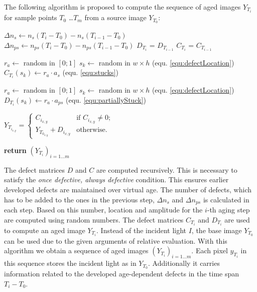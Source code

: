 \documentclass[10pt,twocolumn,letterpaper]{article}
\begin{document}
The following algorithm is proposed to compute the sequence of aged images $Y_{T_i}$ for sample points $T_0$ \dots $T_m$ from a source image $Y_{T_0}$:

\vspace{5mm}
\begin{algorithmic}[1]


\State $\Delta n_s\gets n_s(T_i - T_0) - n_s(T_{i-1} - T_0) $ 
\State $\Delta n_{ps}\gets n_{ps}(T_i - T_0) - n_{ps}(T_{i-1} - T_0) $
\State $D_{T_i}$ = $D_{T_{i-1}}$
\State $C_{T_i}$ = $C_{T_{i-1}}$

    \State $r_a \gets$ random in $[0;1]$
    \State $s_k \gets$ random in $w \times h$ (equ. \ref{equ:defectLocation})
    \State $C_{T_{i}}(s_k) \gets r_a \cdot a_s$ (equ. \ref{equ:stucks})
  \EndFor
  
    \State $r_a \gets$ random in $[0;1]$ 
    \State $s_k \gets$ random in $w \times h$ (equ. \ref{equ:defectLocation})
    \State $D_{T_i}({s_k}) \gets r_a \cdot a_{ps}$ (equ. \ref{equ:partiallyStuck})
  \EndFor
  
  
  $Y_{T_{i_{x,y}}} = \begin{cases}
  C_{i_{x,y}}  & \text{if $C_{i_{x,y}} \neq 0$}; \\
  Y_{T_{0_{x,y}}} +D_{i_{x,y}}  & \text{otherwise}.
  \end{cases}$
  
\EndFor
\State \textbf{return} $(Y_{T_i})_{i=1 \dots m}$
\EndProcedure
\end{algorithmic}

\vspace{5mm}


The defect matrices $D$ and $C$ are computed recursively. This is necessary to satisfy the \emph{once defective, always defective} condition. This ensures earlier developed defects are maintained over virtual age. The number of defects, which has to be added to the ones in the previous step, $\Delta n_s$ and $\Delta n_{ps}$ is calculated in each step. Based on this number, location and amplitude for the $i$-th aging step are computed using random numbers. The defect matrices $C_{T_i}$ and $D_{T_i}$ are used to compute an aged image $Y_{T_i}$. Instead of the incident light $I$, the base image $Y_{T_0}$ can be used due to the given arguments of relative evaluation. With this algorithm we obtain a sequence  of aged images $(Y_{T_i})_{i=1 \dots m}$. Each pixel $y_{T_i}$ in this sequence stores the incident light as in $Y_{T_0}$. Additionally it carries information related to the developed age-dependent defects in the time span $T_i-T_0$.
 
\end{document}
